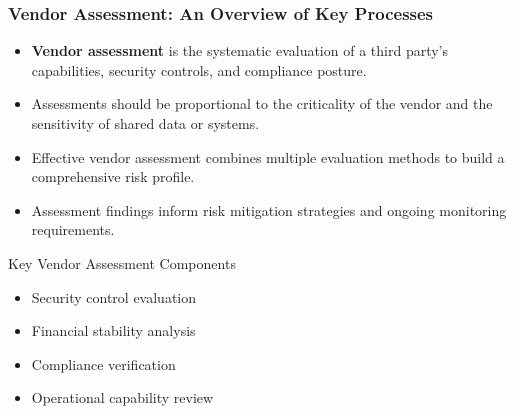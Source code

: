 \documentclass{beamer}
\begin{document}
\begin{frame}
    \frametitle{Vendor Assessment: An Overview of Key Processes}
    
    \begin{itemize}
        \item \textbf{Vendor assessment} is the systematic evaluation of a third party's capabilities, security controls, and compliance posture.
        \item Assessments should be proportional to the criticality of the vendor and the sensitivity of shared data or systems.
        \item Effective vendor assessment combines multiple evaluation methods to build a comprehensive risk profile.
        \item Assessment findings inform risk mitigation strategies and ongoing monitoring requirements.
    \end{itemize}
    
    \begin{block}{Key Vendor Assessment Components}
        \begin{itemize}
            \item Security control evaluation
            \item Financial stability analysis
            \item Compliance verification
            \item Operational capability review
        \end{itemize}
    \end{block}
\end{frame}
\end{document}
